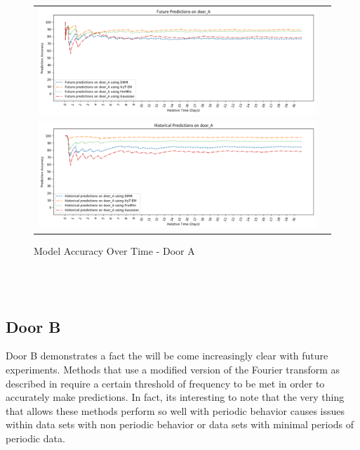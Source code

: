 \begin{center}
\begin{figure}[!Hp]
  \begin{tabular}{cc}
    {\includegraphics[width = 6in]{images/results/Future_Predictions_on_door_A.png}} \\
    {\includegraphics[width = 6in]{images/results/Historical_Predictions_on_door_A.png}} \\
  \end{tabular}
  \caption{Model Accuracy Over Time - Door A}
  \label{figure:accuracy_door_A}
\end{figure} \\ \\
\end{center}

\subsection { Door B }

Door B demonstrates a fact the will be come increasingly clear with future
experiments. Methods that use a modified version of the Fourier transform as
described in \cite{Krajnik2015} require a certain threshold of frequency to be met
in order to accurately make predictions. In fact, its interesting to note that the
very thing that allows these methods perform so well with periodic behavior
causes issues within data sets with non periodic behavior or data sets with
minimal periods of periodic data. \\

